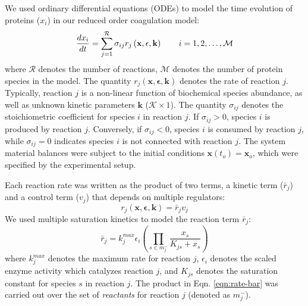 \documentclass[processes,article,received,moreauthors,pdftex,12pt,a4paper]{mdpi}
\begin{document}
We used ordinary differential equations (ODEs) to model the time evolution of proteins ($x_{i}$) in our reduced order coagulation model:
\begin{equation}
	\frac{dx_{i}}{dt}  =  \sum_{j = 1}^{\mathcal{R}}\sigma_{ij}r_{j}\left(\mathbf{x},\mathbf{\epsilon},\mathbf{k}\right)\qquad{i=1,2,\hdots,\mathcal{M}}\\
\end{equation}
where $\mathcal{R}$ denotes the number of reactions, $\mathcal{M}$ denotes the number of protein species in the model. 
The quantity $r_{j}\left(\mathbf{x},\mathbf{\epsilon},\mathbf{k}\right)$ denotes the rate of reaction $j$. 
Typically, reaction $j$ is a non-linear function of biochemical species abundance, as well as unknown kinetic parameters $\mathbf{k}$ ($\mathcal{K}\times{1}$). 
The quantity $\sigma_{ij}$ denotes the stoichiometric coefficient for species $i$ in reaction $j$. 
If $\sigma_{ij}>0$, species $i$ is produced by reaction $j$. 
Conversely, if $\sigma_{ij}<0$, species $i$ is consumed by reaction $j$, while $\sigma_{ij} = 0$ indicates species $i$ is not connected with reaction $j$. 
The system material balances were subject to the initial conditions $\mathbf{x}\left(t_{o}\right) = \mathbf{x}_{o}$, which were specified by the experimental setup.

Each reaction rate was written as the product of two terms, a kinetic term ($\bar{r}_{j}$) and a control term ($v_{j}$) that depends on multiple regulators:
\begin{equation}\label{eqn:rate-factor}
	r_{j}\left(\mathbf{x},\mathbf{\epsilon},\mathbf{k}\right) = \bar{r}_{j}v_{j}
\end{equation}
We used multiple saturation kinetics to model the reaction term $\bar{r}_{j}$:
\begin{equation}\label{eqn:rate-bar}
	\bar{r}_{j} = k_{j}^{max}\epsilon_{i}\left(\prod_{s\in{m_{j}^{-}}}\frac{x_{s}}{K_{js} + x_{s}}\right)
\end{equation}where $k_{j}^{max}$ denotes the maximum rate for reaction $j$, $\epsilon_{i}$ denotes the scaled enzyme activity which catalyzes reaction $j$, and
$K_{js}$ denotes the saturation constant for species $s$ in reaction $j$. 
The product in Eqn. \eqref{eqn:rate-bar} was carried out over the set of \textit{reactants} for reaction $j$ (denoted as $m_{j}^{-}$). 
\end{document}
